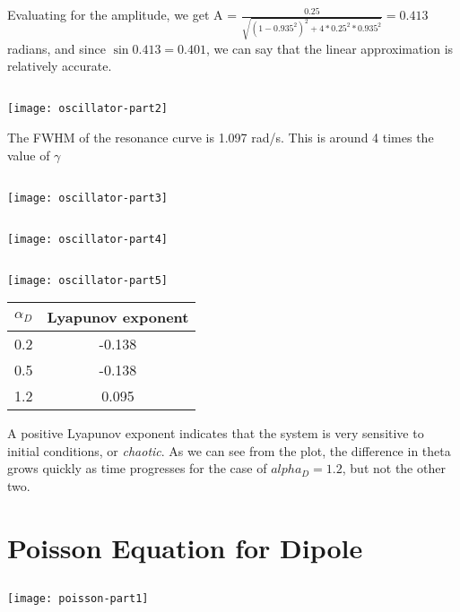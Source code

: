 \documentclass[10pt]{article}
\begin{document}
Evaluating for the amplitude, we get A = \( \frac{0.25}{\sqrt { (1-0.935^{2})^{2} + 4 * 0.25^{2} * 0.935^{2} }} = 0.413   \) radians, and since \(\sin 0.413 = 0.401\), we can say that the linear approximation is relatively accurate.
\subsection{}
\texttt{[image: oscillator-part2]}

The FWHM of the resonance curve is 1.097 rad/s. This is around 4 times the value of $ \gamma $

\subsection{}
\texttt{[image: oscillator-part3]}

\subsection{}
\texttt{[image: oscillator-part4]}

\subsection{}
\texttt{[image: oscillator-part5]}
\begin{center}
\begin{tabular}{ c c }
  $\alpha_{D}$ & Lyapunov exponent \\ \midrule
    0.2 & -0.138 \\
    0.5 & -0.138 \\
    1.2 & 0.095
\end{tabular}
\end{center}
A positive Lyapunov exponent indicates that the system is very sensitive to initial conditions, or \textit{chaotic}. As we can see from the plot, the difference in theta grows quickly as time progresses for the case of \(alpha_{D} = 1.2\), but not the other two.


\section{Poisson Equation for Dipole}
\subsection{}
\texttt{[image: poisson-part1]}
\end{document}
